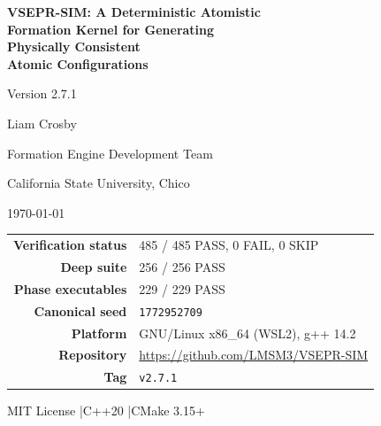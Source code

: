 \documentclass[11pt,twoside]{article}
\begin{document}
\begin{titlepage}
\centering
\vspace*{2cm}

{\Huge\bfseries VSEPR-SIM: A Deterministic Atomistic\\[0.3cm]
Formation Kernel for Generating\\[0.3cm]
Physically Consistent\\[0.1cm]
Atomic Configurations\par}

\vspace{1.2cm}
{\Large Version 2.7.1\par}

\vspace{2cm}

{\large Liam Crosby\par}
\vspace{0.3cm}
{\large Formation Engine Development Team\par}
\vspace{0.3cm}
{\large California State University, Chico\par}

\vspace{1.5cm}

{\large \today\par}

\vspace{2cm}

\begin{minipage}{0.8\textwidth}
\begin{center}
\begin{tabular}{rl}
\toprule
\textbf{Verification status} & 485 / 485 PASS, 0 FAIL, 0 SKIP \\
\textbf{Deep suite}          & 256 / 256 PASS \\
\textbf{Phase executables}   & 229 / 229 PASS \\
\textbf{Canonical seed}      & \texttt{1772952709} \\
\textbf{Platform}            & GNU/Linux x86\_64 (WSL2), g++ 14.2 \\
\textbf{Repository}          & \url{https://github.com/LMSM3/VSEPR-SIM} \\
\textbf{Tag}                 & \texttt{v2.7.1} \\
\bottomrule
\end{tabular}
\end{center}
\end{minipage}

\vfill
{\small MIT License \quad|\quad C++20 \quad|\quad CMake 3.15+}
\end{titlepage}
\end{document}
